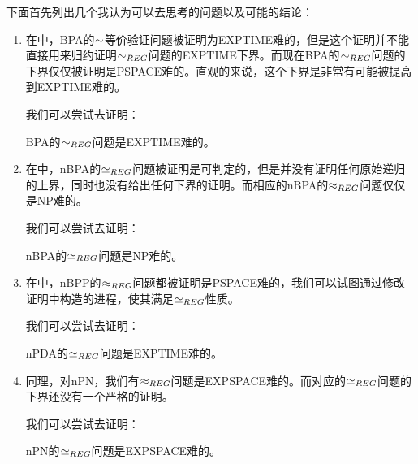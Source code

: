 下面首先列出几个我认为可以去思考的问题以及可能的结论：

\begin{enumerate}
\item 在\cite{Kiefer2012}中，BPA的$\sim$等价验证问题被证明为EXPTIME难的，但是这个证明并不能直接用来归约证明$\sim_{REG}$问题的EXPTIME下界。而现在BPA的$\sim_{REG}$问题的下界仅仅被证明是PSPACE难的\cite{Srba2002b}。直观的来说，这个下界是非常有可能被提高到EXPTIME难的。

我们可以尝试去证明：

\begin{conj}\label{conj:bpa-seq-reg}
BPA的$\sim_{REG}$问题是EXPTIME难的。
\end{conj}

\item 在\cite{Fu2013}中，nBPA的$\beq_{REG}$问题被证明是可判定的，但是并没有证明任何原始递归的上界，同时也没有给出任何下界的证明。而相应的nBPA的$\weq_{REG}$问题仅仅是NP难的\cite{Srba2003,StriAbra1998}。

我们可以尝试去证明：

\begin{conj}\label{conj:nbpa-beq-reg}
nBPA的$\beq_{REG}$问题是NP难的。
\end{conj}

\item 在\cite{Srba2003}中，nBPP的$\weq_{REG}$问题都被证明是PSPACE难的，我们可以试图通过修改证明中构造的进程，使其满足$\beq_{REG}$性质。

我们可以尝试去证明：

\begin{conj}[nBPP $\beq_{REG}$问题下界}\label{conj:nbpp-beq-reg}
nBPP的$\beq_{REG}$问题是PSPACE难的。
\end{conj}

\item 对nPDA，我们也有$\weq_{REG}$问题是EXPTIME难的\cite{Kucera2002a,Srba2002b}。而对应的$\beq_{REG}$问题并没有给出下界结论。

我们可以尝试去证明：

\begin{conj}[nPDA $\beq_{REG}$问题下界]\label{conj:npda-beq-reg}
nPDA的$\beq_{REG}$问题是EXPTIME难的。
\end{conj}

\item 同理，对nPN，我们有$\weq_{REG}$问题是EXPSPACE难的\cite{Cardoza1976}。而对应的$\beq_{REG}$问题的下界还没有一个严格的证明。

我们可以尝试去证明：

\begin{conj}\label{conj:npn-beq-reg}
nPN的$\beq_{REG}$问题是EXPSPACE难的。
\end{conj}
\end{enumerate}

